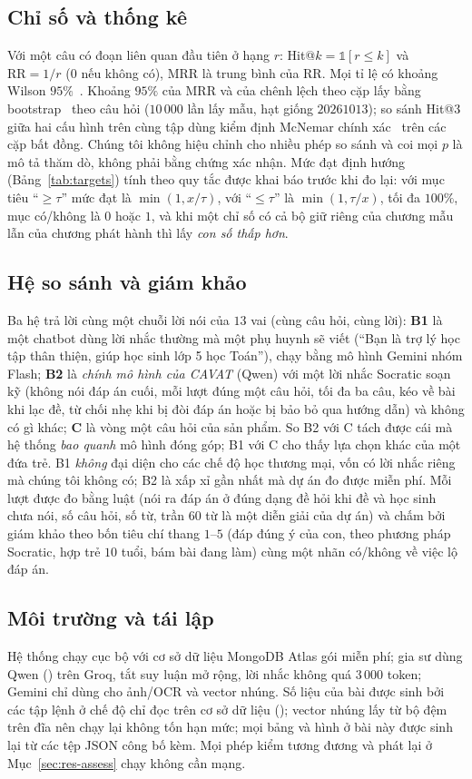 \subsection{Chỉ số và thống kê}
Với một câu có đoạn liên quan đầu tiên ở hạng $r$: Hit@$k=\mathbb{1}[r\le k]$ và $\mathrm{RR}=1/r$ ($0$ nếu không có), MRR là trung bình của RR. Mọi tỉ lệ có khoảng Wilson $95\%$~\cite{wilson1927}. Khoảng $95\%$ của MRR và của chênh lệch theo cặp lấy bằng bootstrap~\cite{efron1993} theo câu hỏi ($10\,000$ lần lấy mẫu, hạt giống $20261013$); so sánh Hit@3 giữa hai cấu hình trên cùng tập dùng kiểm định McNemar chính xác~\cite{mcnemar1947} trên các cặp bất đồng. Chúng tôi không hiệu chỉnh cho nhiều phép so sánh và coi mọi $p$ là mô tả thăm dò, không phải bằng chứng xác nhận. Mức đạt định hướng (Bảng~\ref{tab:targets}) tính theo quy tắc được khai báo trước khi đo lại: với mục tiêu ``$\ge\tau$'' mức đạt là $\min(1,x/\tau)$, với ``$\le\tau$'' là $\min(1,\tau/x)$, tối đa $100\%$, mục có/không là $0$ hoặc $1$, và khi một chỉ số có cả bộ giữ riêng của chương mẫu lẫn của chương phát hành thì lấy \emph{con số thấp hơn}.

\subsection{Hệ so sánh và giám khảo}
Ba hệ trả lời cùng một chuỗi lời nói của $13$ vai (cùng câu hỏi, cùng lời): \textbf{B1} là một chatbot dùng lời nhắc thường mà một phụ huynh sẽ viết (``Bạn là trợ lý học tập thân thiện, giúp học sinh lớp 5 học Toán''), chạy bằng mô hình Gemini nhóm Flash; \textbf{B2} là \emph{chính mô hình của CAVAT} (Qwen) với một lời nhắc Socratic soạn kỹ (không nói đáp án cuối, mỗi lượt đúng một câu hỏi, tối đa ba câu, kéo về bài khi lạc đề, từ chối nhẹ khi bị đòi đáp án hoặc bị bảo bỏ qua hướng dẫn) và không có gì khác; \textbf{C} là vòng một câu hỏi của sản phẩm. So B2 với C tách được cái mà hệ thống \emph{bao quanh} mô hình đóng góp; B1 với C cho thấy lựa chọn khác của một đứa trẻ. B1 \emph{không} đại diện cho các chế độ học thương mại, vốn có lời nhắc riêng mà chúng tôi không có; B2 là xấp xỉ gần nhất mà dự án đo được miễn phí. Mỗi lượt được đo bằng luật (nói ra đáp án ở đúng dạng đề hỏi khi đề và học sinh chưa nói, số câu hỏi, số từ, trần $60$ từ là một diễn giải của dự án) và chấm bởi giám khảo  theo bốn tiêu chí thang $1$--$5$ (đáp đúng ý của con, theo phương pháp Socratic, hợp trẻ $10$ tuổi, bám bài đang làm) cùng một nhãn có/không về việc lộ đáp án.

\subsection{Môi trường và tái lập}
Hệ thống chạy cục bộ với cơ sở dữ liệu MongoDB Atlas gói miễn phí; gia sư dùng Qwen () trên Groq, tắt suy luận mở rộng, lời nhắc không quá $3\,000$ token; Gemini chỉ dùng cho ảnh/OCR và vector nhúng. Số liệu của bài được sinh bởi các tập lệnh ở chế độ chỉ đọc trên cơ sở dữ liệu (); vector nhúng lấy từ bộ đệm trên đĩa nên chạy lại không tốn hạn mức; mọi bảng và hình ở bài này được sinh lại từ các tệp JSON công bố kèm. Mọi phép kiểm tương đương và phát lại ở Mục~\ref{sec:res-assess} chạy không cần mạng.
